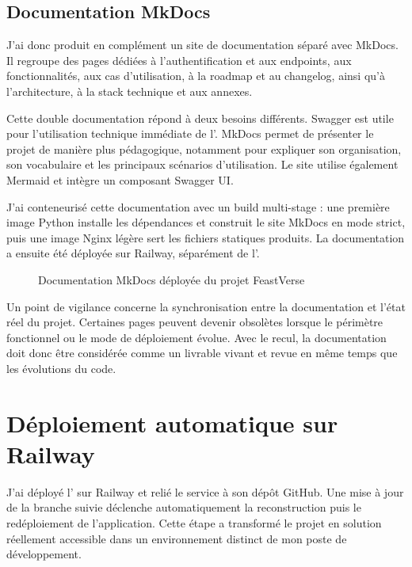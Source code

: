 \subsection{Documentation MkDocs}

J'ai donc produit en complément un site de documentation séparé avec MkDocs. Il regroupe des pages dédiées à l'authentification et aux endpoints, aux fonctionnalités, aux cas d'utilisation, à la roadmap et au changelog, ainsi qu'à l'architecture, à la stack technique et aux annexes.

Cette double documentation répond à deux besoins différents. Swagger est utile pour l'utilisation technique immédiate de l'. MkDocs permet de présenter le projet de manière plus pédagogique, notamment pour expliquer son organisation, son vocabulaire et les principaux scénarios d'utilisation. Le site utilise également Mermaid et intègre un composant Swagger UI.

J'ai conteneurisé cette documentation avec un build multi-stage : une première image Python installe les dépendances et construit le site MkDocs en mode strict, puis une image Nginx légère sert les fichiers statiques produits. La documentation a ensuite été déployée sur Railway, séparément de l'.

\begin{figure}[H]
\centering
{}
\caption{Documentation MkDocs déployée du projet FeastVerse}
\label{fig:mkdocs-feastverse}
\end{figure}

Un point de vigilance concerne la synchronisation entre la documentation et l'état réel du projet. Certaines pages peuvent devenir obsolètes lorsque le périmètre fonctionnel ou le mode de déploiement évolue. Avec le recul, la documentation doit donc être considérée comme un livrable vivant et revue en même temps que les évolutions du code.

\section{Déploiement automatique sur Railway}

J'ai déployé l' sur Railway et relié le service à son dépôt GitHub. Une mise à jour de la branche suivie déclenche automatiquement la reconstruction puis le redéploiement de l'application. Cette étape a transformé le projet en solution réellement accessible dans un environnement distinct de mon poste de développement.

